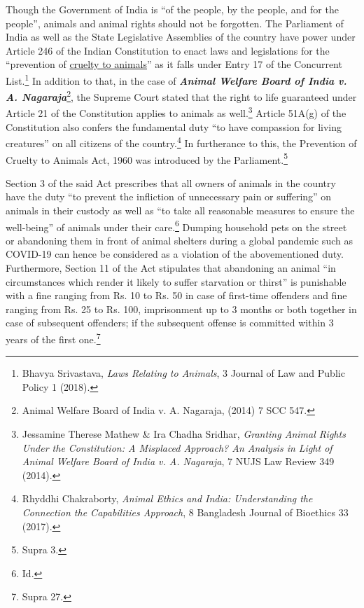 \begin{multicols}{2}

\vspace{-.15cm}

\noi
Though the Government of India is “of the people, by the people, and for the people”,
animals and animal rights should not be forgotten. The Parliament of India as well as the
State Legislative Assemblies of the country have power under Article 246 of the Indian
Constitution to enact laws and legislations for the “prevention of \underline{cruelty to animals}” as it falls
under Entry 17 of the Concurrent List.\footnote{Bhavya Srivastava, \textit{Laws Relating to Animals}, 3 Journal of Law and Public Policy 1 (2018).} In addition to that, in the case of {\it {\bfseries Animal Welfare
Board of India v. A. Nagaraja}}\footnote{Animal Welfare Board of India v. A. Nagaraja, (2014) 7 SCC 547.}, the Supreme Court stated that the right to life guaranteed
under Article 21 of the Constitution applies to animals as well.\footnote{Jessamine Therese Mathew \& Ira Chadha Sridhar, \textit{Granting Animal Rights Under the Constitution: A Misplaced Approach? An Analysis in Light of Animal Welfare Board of India v. A. Nagaraja}, 7 NUJS Law Review 349 (2014).} Article 51A(g) of the
Constitution also confers the fundamental duty “to have compassion for living creatures” on
all citizens of the country.\footnote{Rhyddhi Chakraborty, \textit{Animal Ethics and India: Understanding the Connection the Capabilities Approach}, 8
Bangladesh Journal of Bioethics 33 (2017).} In furtherance to this, the Prevention of Cruelty to Animals Act,
1960 was introduced by the Parliament.\footnote{Supra 3.}

\noi
Section 3 of the said Act prescribes that all owners of animals in the country have the duty
“to prevent the infliction of unnecessary pain or suffering” on animals in their custody as well
as “to take all reasonable measures to ensure the well-being” of animals under their care.\footnote{Id.}
Dumping household pets on the street or abandoning them in front of animal shelters during a
global pandemic such as COVID-19 can hence be considered as a violation of the abovementioned duty. Furthermore, Section 11 of the Act stipulates that abandoning an animal “in
circumstances which render it likely to suffer starvation or thirst” is punishable with a fine
ranging from Rs. 10 to Rs. 50 in case of first-time offenders and fine ranging from Rs. 25 to Rs. 100, imprisonment up to 3 months or both together in case of subsequent offenders; if the
subsequent offense is committed within 3 years of the first one.\footnote{Supra 27.}


\end{multicols}
